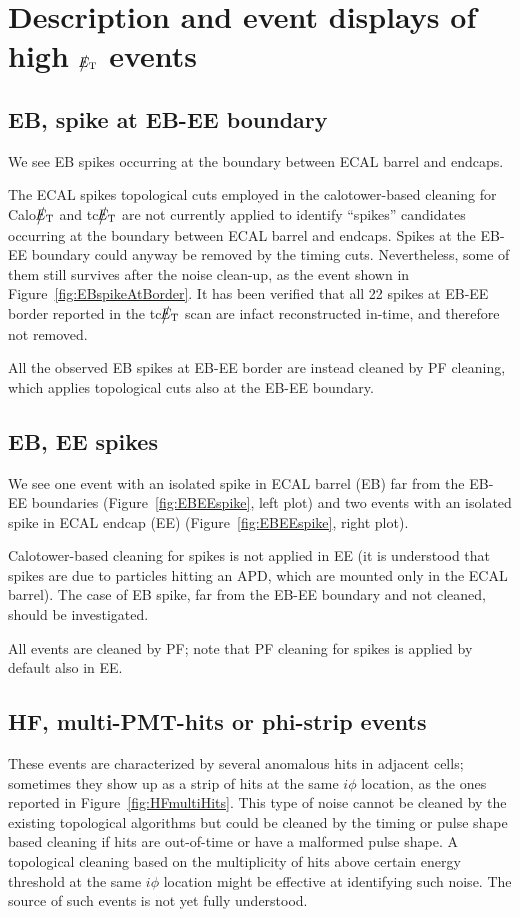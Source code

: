 \section{Description and event displays of high $\big\slash\hspace{-1.6ex}{E_\text{T}}$ events}

\subsection{EB, spike at EB-EE boundary}
We see EB spikes occurring at the boundary between ECAL barrel and endcaps.

The ECAL spikes topological cuts employed in the calotower-based cleaning for Calo$\big\slash\hspace{-1.6ex}{E_\text{T}}$ and tc$\big\slash\hspace{-1.6ex}{E_\text{T}}$ 
are not currently applied to identify ``spikes'' candidates occurring at the boundary between ECAL barrel and endcaps. 
Spikes at the EB-EE boundary could anyway be removed by the timing cuts. Nevertheless, some of them still survives 
after the noise clean-up, as the event shown in Figure~\ref{fig:EBspikeAtBorder}.
It has been verified that all 22 spikes at EB-EE border reported in the tc$\big\slash\hspace{-1.6ex}{E_\text{T}}$ scan are 
infact reconstructed in-time, and therefore not removed.

All the observed EB spikes at EB-EE border are instead cleaned by PF cleaning, which applies topological cuts 
also at the EB-EE boundary.

\subsection{EB, EE spikes}
We see one event with an isolated spike in ECAL barrel (EB) far from the EB-EE boundaries 
(Figure~\ref{fig:EBEEspike}, left plot) and two events with an isolated spike in ECAL 
endcap (EE) (Figure~\ref{fig:EBEEspike}, right plot).

Calotower-based cleaning for spikes is not applied in EE (it is understood that 
spikes are due to particles hitting an APD, which are mounted only in the ECAL barrel). 
The case of EB spike, far from the EB-EE boundary and not cleaned, should be investigated.

All events are cleaned by PF; note that PF cleaning for spikes is applied by default also in EE.

\subsection{HF, multi-PMT-hits or phi-strip events}
These events are characterized by several anomalous hits in adjacent cells; sometimes they show up as
a strip of hits at the same $i\phi$ location, as the ones reported in Figure~\ref{fig:HFmultiHits}. 
This type of noise cannot be cleaned by the existing topological algorithms but could 
be cleaned by the timing or pulse shape based 
cleaning if hits are out-of-time or have a malformed pulse shape. 
A topological cleaning based on the multiplicity of hits above certain energy threshold 
at the same $i\phi$ location might be effective at identifying such noise.
The source of such events is not yet fully understood.

